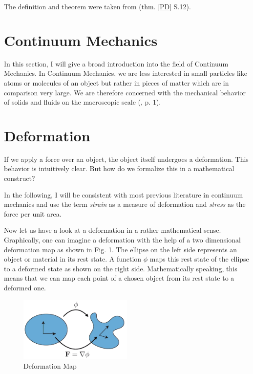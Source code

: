 The definition and theorem were taken from \cite{Spencer1980} (thm. \ref{PD} S.12).





\section{Continuum Mechanics}
In this section, I will give a broad introduction into the field of Continuum Mechanics. In Continuum Mechanics, we are less interested in small particles like atoms or molecules of an object but rather in pieces of matter which are in comparison very large. We are therefore concerned with the mechanical behavior of solids and fluids on the macroscopic scale (\cite{Spencer1980}, p. 1).


\section{Deformation}
If we apply a force over an object, the object itself undergoes a deformation. This behavior is intuitively clear. But how do we formalize this in a mathematical construct? 

In the following, I will be consistent with most previous literature in continuum mechanics and use the term \textit{strain} as a measure of deformation and \textit{stress} as the force per unit area.


Now let us have a look at a deformation in a rather mathematical sense. Graphically, one can imagine a deformation with the help of a two dimensional deformation map as shown in Fig. \ref{fig:deformationmap}. The ellipse on the left side represents an object or material in its rest state. A function $\phi$ maps this rest state of the ellipse to a deformed state as shown on the right side. Mathematically speaking, this means that we can map each point of a chosen object from its rest state to a deformed one.

\begin{figure}[!htbp]
	\centering
	\includegraphics[width=0.5\textwidth]{resources/deformation_map}
	\caption{Deformation Map {\cite{STREAM2018}}}
	\label{fig:deformationmap}
\end{figure}

